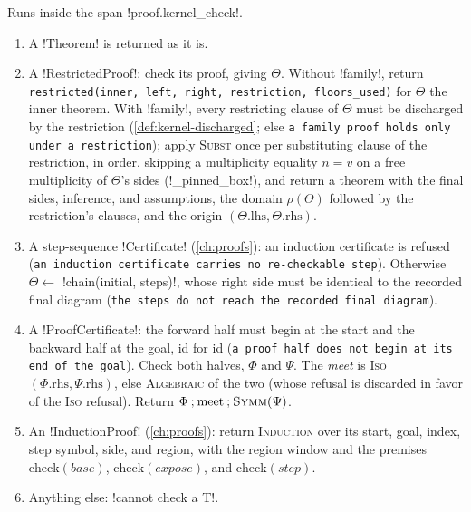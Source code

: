 \begin{algorithm}\label{alg:kernel-check}
Runs inside the span \code!proof.kernel_check!.
\begin{enumerate}
\item A \py!Theorem! is returned as it is.
\item A \py!RestrictedProof!: check its proof, giving $\Theta$. Without \code!family!, return \texttt{restricted(\allowbreak{}inner,\allowbreak{} left,\allowbreak{} right,\allowbreak{} restriction,\allowbreak{} floors\_\allowbreak{}used)} for $\Theta$ the inner theorem. With \code!family!, every restricting clause of $\Theta$ must be discharged by the restriction (\cref{def:kernel-discharged}; else \texttt{a family proof holds only under a restriction}); apply \textsc{Subst} once per substituting clause of the restriction, in order, skipping a multiplicity equality $n=v$ on a free multiplicity of $\Theta$'s sides (\py!_pinned_box!), and return a theorem with the final sides, inference, and assumptions, the domain $\rho(\Theta)$ followed by the restriction's clauses, and the origin $(\Theta.\mathrm{lhs},\Theta.\mathrm{rhs})$.
\item A step-sequence \py!Certificate! (\cref{ch:proofs}): an induction certificate is refused (\texttt{an induction certificate carries no re-checkable step}). Otherwise $\Theta\gets$ \py!chain(initial, steps)!, whose right side must be identical to the recorded final diagram (\texttt{the steps do not reach the recorded final diagram}).
\item A \py!ProofCertificate!: the forward half must begin at the start and the backward half at the goal, id for id (\texttt{a proof half does not begin at its end of the goal}). Check both halves, $\Phi$ and $\Psi$. The \emph{meet} is \textsc{Iso}$(\Phi.\mathrm{rhs},\Psi.\mathrm{rhs})$, else \textsc{Algebraic} of the two (whose refusal is discarded in favor of the \textsc{Iso} refusal). Return $\Phi\mathbin{;}\text{meet}\mathbin{;}\textsc{Symm}(\Psi)$.
\item An \py!InductionProof! (\cref{ch:proofs}): return \textsc{Induction} over its start, goal, index, step symbol, side, and region, with the region window and the premises $\mathrm{check}(\mathit{base})$, $\mathrm{check}(\mathit{expose})$, and $\mathrm{check}(\mathit{step})$.
\item Anything else: \code!cannot check a T!.
\end{enumerate}
\end{algorithm}

